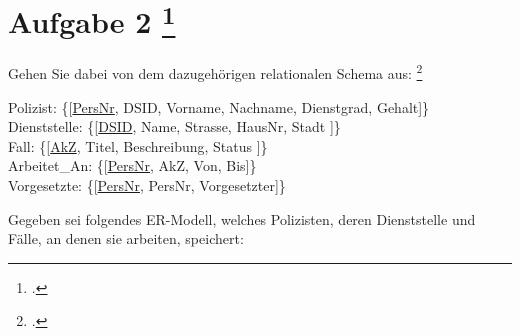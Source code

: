 \documentclass{lehramt-informatik-minimal}
\begin{document}
\section{Aufgabe 2
\footcite[Thema 1 Teilaufgabe 1 Aufgabe 2]{examen:66116:2016:03}}

\noindent
Gehen Sie dabei von dem dazugehörigen relationalen Schema aus:
\footcite{db:pu:3}

\bigskip

{
\noindent
\ttfamily
\footnotesize
Polizist: \{[\underline{PersNr}, DSID, Vorname, Nachname, Dienstgrad, Gehalt]\}\\
Dienststelle: \{[\underline{DSID}, Name, Strasse, HausNr, Stadt ]\}\\
Fall: \{[\underline{AkZ}, Titel, Beschreibung, Status ]\}\\
Arbeitet\_An: \{[\underline{PersNr}, AkZ, Von, Bis]\}\\
Vorgesetzte: \{[\underline{PersNr}, PersNr, Vorgesetzter]\}
}

\bigskip

\noindent
Gegeben sei folgendes ER-Modell, welches Polizisten, deren Dienststelle
und Fälle, an denen sie arbeiten, speichert:
\end{document}
